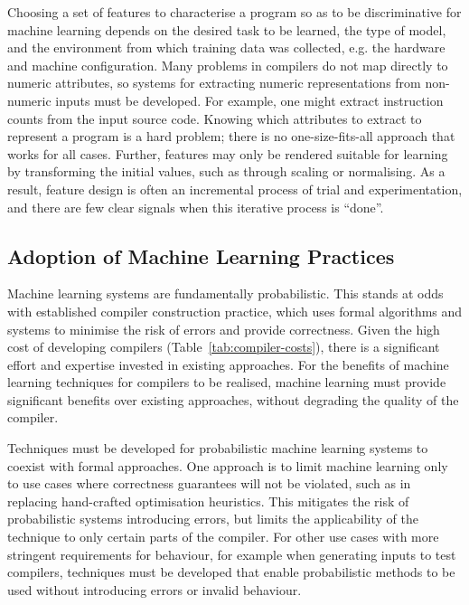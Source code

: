 Choosing a set of features to characterise a program so as to be discriminative for machine learning  depends on the desired task to be learned, the type of model, and the environment from which training data was collected, e.g. the hardware and machine configuration. Many problems in compilers do not map directly to numeric attributes, so systems for extracting numeric representations from non-numeric inputs must be developed. For example, one might extract instruction counts from the input source code. Knowing which attributes to extract to represent a program is a hard problem; there is no one-size-fits-all approach that works for all cases. Further, features may only be rendered suitable for learning by transforming the initial values, such as through scaling or normalising. As a result, feature design is often an incremental process of trial and experimentation, and there are few clear signals when this iterative process is ``done''.


\subsection{Adoption of Machine Learning Practices}
\label{subsec:challenge-adoption}

Machine learning systems are fundamentally probabilistic. This stands at odds with established compiler construction practice, which uses formal algorithms and systems to minimise the risk of errors and provide correctness. Given the high cost of developing compilers (Table~\ref{tab:compiler-costs}), there is a significant effort and expertise invested in existing approaches. For the benefits of machine learning techniques for compilers to be realised, machine learning must provide significant benefits over existing approaches, without degrading the quality of the compiler.

Techniques must be developed for probabilistic machine learning systems to coexist with formal approaches. One approach is to limit machine learning only to use cases where correctness guarantees will not be violated, such as in replacing hand-crafted optimisation heuristics. This mitigates the risk of probabilistic systems introducing errors, but limits the applicability of the technique to only certain parts of the compiler. For other use cases with more stringent requirements for behaviour, for example when generating inputs to test compilers, techniques must be developed that enable probabilistic methods to be used without introducing errors or invalid behaviour.


